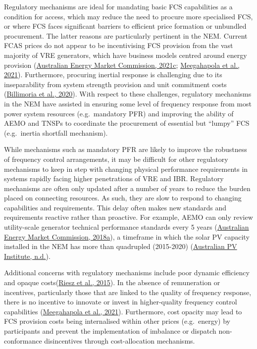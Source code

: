 \documentclass[12pt,a4paper,]{report}
\begin{document}
Regulatory mechanisms are ideal for mandating basic FCS capabilities as
a condition for access, which may reduce the need to procure more
specialised FCS, or where FCS faces significant barriers to efficient
price formation or unbundled procurement. The latter reasons are
particularly pertinent in the NEM. Current FCAS prices do not appear to
be incentivising FCS provision from the vast majority of VRE generators,
which have business models centred around energy provision
(\protect\hyperlink{ref-australianenergymarketcommissionReserveServicesNational2021}{Australian
Energy Market Commission, 2021c};
\protect\hyperlink{ref-meegahapolaPowerSystemStability2021}{Meegahapola
et al., 2021}). Furthermore, procuring inertial response is challenging
due to its inseparability from system strength provision and unit
commitment costs
(\protect\hyperlink{ref-billimoriaMarketDesignSystem2020}{Billimoria et
al., 2020}). With respect to these challenges, regulatory mechanisms in
the NEM have assisted in ensuring some level of frequency response from
most power system resources (e.g.~mandatory PFR) and improving the
ability of AEMO and TNSPs to coordinate the procurement of essential but
``lumpy'' FCS (e.g.~inertia shortfall mechanism).

While mechanisms such as mandatory PFR are likely to improve the
robustness of frequency control arrangements, it may be difficult for
other regulatory mechanisms to keep in step with changing physical
performance requirements in systems rapidly facing higher penetrations
of VRE and IBR. Regulatory mechanisms are often only updated after a
number of years to reduce the burden placed on connecting resources. As
such, they are slow to respond to changing capabilities and
requirements. This delay often makes new standards and requirements
reactive rather than proactive. For example, AEMO can only review
utility-scale generator technical performance standards every 5 years
(\protect\hyperlink{ref-australianenergymarketcommissionGeneratorTechnicalPerformance2018}{Australian
Energy Market Commission, 2018a}), a timeframe in which the solar PV
capacity installed in the NEM has more than quadrupled (2015-2020)
(\protect\hyperlink{ref-australianpvinstituteInstalledPVGeneration}{Australian
PV Institute, n.d.}).

Additional concerns with regulatory mechanisms include poor dynamic
efficiency and opaque
costs(\protect\hyperlink{ref-rieszFrequencyControlAncillary2015}{Riesz
et al., 2015}). In the absence of remuneration or incentives,
particularly those that are linked to the quality of frequency response,
there is no incentive to innovate or invest in higher-quality frequency
control capabilities
(\protect\hyperlink{ref-meegahapolaPowerSystemStability2021}{Meegahapola
et al., 2021}). Furthermore, cost opacity may lead to FCS provision
costs being internalised within other prices (e.g.~energy) by
participants and prevent the implementation of imbalance or dispatch
non-conformance disincentives through cost-allocation mechanisms.
\end{document}
